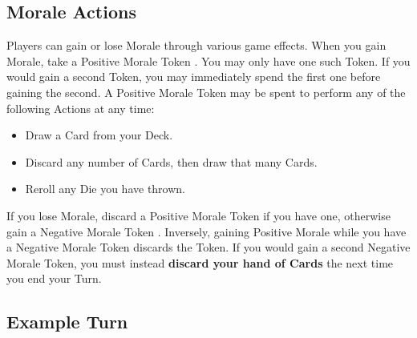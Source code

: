 \begin{multicols}{2}
\subsection*{Morale Actions}
Players can gain or lose Morale through various game effects.
When you gain Morale, take a Positive Morale Token .
You may only have one such Token.
If you would gain a second Token, you may immediately spend the first one before gaining the second.
A Positive Morale Token may be spent to perform any of the following Actions at any time:
\begin{itemize}
  \item Draw a Card from your Deck.
  \item Discard any number of Cards, then draw that many Cards.
  \item Reroll any Die you have thrown.
\end{itemize}
If you lose Morale, discard a Positive Morale Token  if you have one, otherwise gain a Negative Morale Token .
Inversely, gaining Positive Morale while you have a Negative Morale Token discards the Token.
If you would gain a second Negative Morale Token, you must instead \textbf{discard your hand of Cards} the next time you end your Turn.\par


\begin{center}
\end{center}

\subsection*{Example Turn}


\end{multicols}
